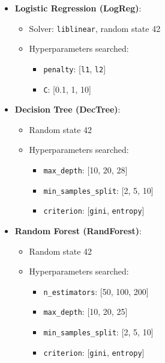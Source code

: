 \documentclass[11pt]{article}
\begin{document}
\begin{itemize}
    \item \textbf{Logistic Regression (LogReg)}: 
    \begin{itemize}
        \item Solver: \texttt{liblinear}, random state 42
        \item Hyperparameters searched: 
        \begin{itemize}
            \item \texttt{penalty}: [\texttt{l1}, \texttt{l2}]
            \item \texttt{C}: [0.1, 1, 10]
        \end{itemize}
    \end{itemize}

    \item \textbf{Decision Tree (DecTree)}: 
    \begin{itemize}
        \item Random state 42
        \item Hyperparameters searched:
        \begin{itemize}
            \item \texttt{max\_depth}: [10, 20, 28]
            \item \texttt{min\_samples\_split}: [2, 5, 10]
            \item \texttt{criterion}: [\texttt{gini}, \texttt{entropy}]
        \end{itemize}
    \end{itemize}

    \item \textbf{Random Forest (RandForest)}: 
    \begin{itemize}
        \item Random state 42
        \item Hyperparameters searched:
        \begin{itemize}
            \item \texttt{n\_estimators}: [50, 100, 200]
            \item \texttt{max\_depth}: [10, 20, 25]
            \item \texttt{min\_samples\_split}: [2, 5, 10]
            \item \texttt{criterion}: [\texttt{gini}, \texttt{entropy}]
        \end{itemize}
    \end{itemize}


\end{itemize}
\end{document}
